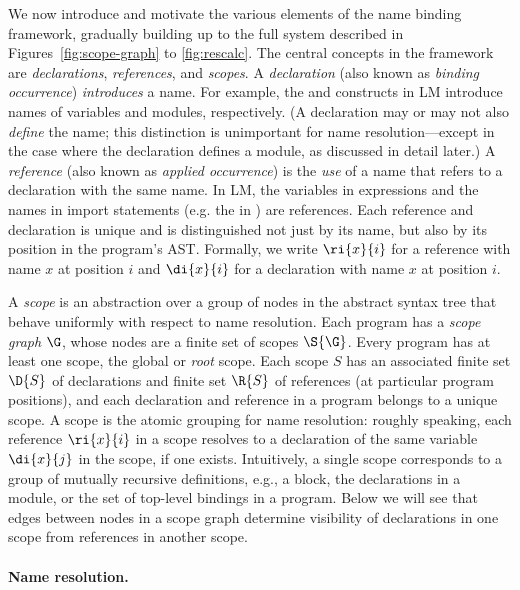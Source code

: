 We now introduce and motivate the various elements of the name binding framework,
gradually building up to the full system described
in Figures~\ref{fig:scope-graph} to \ref{fig:rescalc}.
The central concepts in the framework are \emph{declarations},
\emph{references}, and \emph{scopes}.
A \emph{declaration} (also known as \emph{binding occurrence}) \emph{introduces} a
name.
For example, the  and 
constructs in LM introduce names of variables and
modules, respectively.  (A declaration may or may not also \emph{define} the name;
this distinction is unimportant for name resolution---except in the case where
the declaration defines a module, as discussed in detail later.)
A \emph{reference} (also known as \emph{applied occurrence}) is the
\emph{use} of a name that refers to a declaration with the same name.
In LM, the variables in expressions and the names in import
statements (e.g. the  in ) are references.
Each reference and declaration is unique and is distinguished not
just by its name, but also by its position in the program's AST.
Formally, we write $\ri{x}{i}$ for a reference with name $x$ at position $i$ and
$\di{x}{i}$ for a declaration with name $x$ at position $i$. 

A \emph{scope} is an abstraction over a group of nodes in the abstract syntax tree that behave
uniformly with respect to name resolution.
Each program has a \emph{scope graph} $\G$, whose nodes are 
a finite set of scopes $\S{\G}$.
Every program has at least one scope,
the global or \emph{root} scope.
Each scope $S$ has an associated
finite set $\D{S}$ of declarations and finite set $\R{S}$ of references 
(at particular program positions), and 
each declaration and reference in a program belongs to a unique scope.
A scope is the atomic grouping for name resolution: roughly speaking, 
each reference $\ri{x}{i}$ in a scope resolves to a declaration of the 
same variable $\di{x}{j}$ in the scope, if one exists. 
Intuitively, a single scope corresponds to a group of mutually recursive
definitions, e.g., a  block, the declarations in a module, or
the set of top-level bindings in a program. 
Below we will see that edges between
nodes in a scope graph determine visibility of declarations in one scope
from references in another scope.

\paragraph{Name resolution.}

